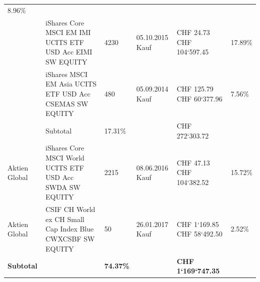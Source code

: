 \documentclass[9pt,landscape,a4paper]{report}
\begin{document}
\begin{longtable}{L{5.5cm} L{5.5cm} R{2.5cm} R{2.5cm} R{2.5cm} R{3cm}}
8.96{\%} \\  & iShares Core MSCI EM IMI UCITS ETF USD Acc \newline EIMI SW EQUITY \newline  & 4230  & 05.10.2015 \newline Kauf & CHF  24.73 \newline CHF 104`597.45 & 17.89{\%}  \\  & iShares MSCI EM Asia UCITS ETF USD Acc \newline CSEMAS SW EQUITY \newline  & 480  & 05.09.2014 \newline Kauf & CHF  125.79 \newline CHF 60`377.96 & 7.56{\%}  \\* \hline  \bf{} & Subtotal & 17.31\% & & CHF  272`303.72 & \\ \hline  {}  Aktien Global \newline & iShares Core MSCI World UCITS ETF USD Acc \newline SWDA SW EQUITY \newline  & 2215  & 08.06.2016 \newline Kauf & CHF  47.13 \newline CHF 104`382.52 & 15.72{\%}  \\ \hline Aktien Global \newline & CSIF CH World ex CH Small Cap Index Blue \newline CWXCSBF SW EQUITY \newline  & 50  & 26.01.2017 \newline Kauf & CHF  1`169.85 \newline CHF 58`492.50 & 2.52{\%}  \\ \bottomrule[1pt] \textbf{Subtotal} & & \bf{74.37}\% &  & \bf{ CHF  1`169`747.35} & \end{longtable}

\footnotesize \renewcommand*{\arraystretch}{1.5}
\end{document}
